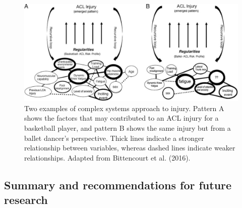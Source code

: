 \documentclass[man,floatsintext]{apa6}
\begin{document}
\begin{figure}

{\centering \includegraphics[width=1\linewidth]{figs/measures/wob} 

}

\caption{Two examples of complex systems approach to injury. Pattern A shows the factors that may contributed to an ACL injury for a basketball player, and pattern B shows the same injury but from a ballet dancer's perspective. Thick lines indicate a stronger relationship between variables, whereas dashed lines indicate weaker relationships. Adapted from Bittencourt et al. (2016).}\label{fig:web}
\end{figure}

\hypertarget{summary-and-recommendations-for-future-research}{%
\subsection{Summary and recommendations for future research}\label{summary-and-recommendations-for-future-research}}
\end{document}
